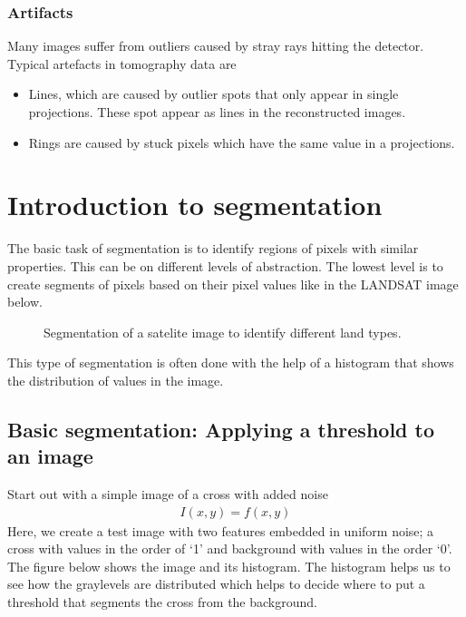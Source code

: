 \documentclass[letterpaper,10pt,english]{sphinxmanual}
\begin{document}
\subsubsection{Artifacts}
\label{\detokenize{ML4NeutronImageSegmentation:artifacts}}
Many images suffer from outliers caused by stray rays hitting the detector. Typical artefacts in tomography data are
\begin{itemize}
\item {} 
Lines, which are caused by outlier spots that only appear in single projections. These spot appear as lines in the reconstructed images.

\item {} 
Rings are caused by stuck pixels which have the same value in a projections.

\end{itemize}


\section{Introduction to segmentation}
\label{\detokenize{ML4NeutronImageSegmentation:introduction-to-segmentation}}
The basic task of segmentation is to identify regions of pixels with similar properties. This can be on different levels of abstraction. The lowest level is to create segments of pixels based on their pixel values like in the LANDSAT image below.

\begin{figure}[htbp]
\centering
\capstart

\noindent{}
\caption{Segmentation of a satelite image to identify different land types.}\label{\detokenize{ML4NeutronImageSegmentation:id7}}\end{figure}

This type of segmentation is often done with the help of a histogram that shows the distribution of values in the image.




\subsection{Basic segmentation: Applying a threshold to an image}
\label{\detokenize{ML4NeutronImageSegmentation:basic-segmentation-applying-a-threshold-to-an-image}}
Start out with a simple image of a cross with added noise
\begin{equation*}
\begin{split} I(x,y) = f(x,y) \end{split}
\end{equation*}
Here, we create a test image with two features embedded in uniform noise; a cross with values in the order of ‘1’ and background with values in the order ‘0’. The figure below shows the image and its histogram. The histogram helps us to see how the graylevels are distributed which helps to decide where to put a threshold that segments the cross from the background.
\end{document}
